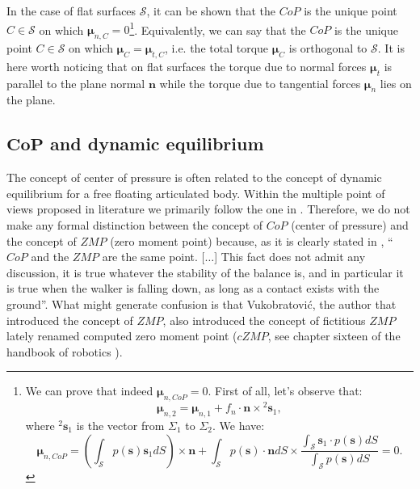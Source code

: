 \documentclass[12pt,a4paper,twoside]{article}
\begin{document}
In the case of flat surfaces $\mathcal S$, it can be shown \cite{sardain2004} that the $CoP$ is the unique point $C \in \mathcal S$ on which $\boldsymbol\mu_{n,C} = 0$\footnote{We can prove that indeed $\boldsymbol\mu_{n,CoP} = 0$. First of all, let's observe that:
$$ 
\boldsymbol\mu_{n,2} = \boldsymbol\mu_{n,1} + f_n \cdot \mathbf n \times \mathbf {}^2 \mathbf s_{1},
$$
where ${}^2 \mathbf s_{1}$ is the vector from $\Sigma_1$ to $\Sigma_2$. We have:
$$
\boldsymbol\mu_{n,CoP} = \left( \int_{\mathcal S} p(\mathbf s) \mathbf s_1 dS \right) \times \mathbf n  + \int_{\mathcal S} p(\mathbf s) \cdot \mathbf n dS \times \frac{\int_{\mathcal S} \mathbf s_1 \cdot p(\mathbf s) dS}{\int_{\mathcal S} p(\mathbf s) dS} = 0.
$$}. Equivalently, we can say that the $CoP$ is the unique point $C \in \mathcal S$ on which  $\boldsymbol\mu_{C} = \boldsymbol\mu_{t,C}$, i.e. the total torque $\boldsymbol\mu_{C}$ is orthogonal to $\mathcal S$. It is here worth noticing that on flat surfaces the torque due to normal forces $\boldsymbol\mu_{t}$ is parallel to the plane normal $\mathbf n$ while the torque due to tangential forces $\boldsymbol\mu_{n}$ lies on the plane. 

\subsection{$\bm {CoP}$ and dynamic equilibrium}

The concept of center of pressure is often related to the concept of dynamic equilibrium for a free floating articulated body. Within the multiple point of views proposed in literature we primarily follow the one in \cite{sardain2004}. Therefore, we do not make any formal distinction between the concept of $CoP$ (center of pressure) and the concept of $ZMP$ (zero moment point) because, as it is clearly stated in \cite{sardain2004}, ``$CoP$ and the $ZMP$ are the same point. [$\dots$] This fact does not admit any discussion, it is true whatever the stability of the balance is, and in particular it is true when the walker is falling down, as long as a contact exists with the ground''. What might generate confusion is that Vukobratovi\'c, the author that introduced the concept of $ZMP$, also introduced the concept of fictitious $ZMP$ lately renamed computed zero moment point ($cZMP$, see chapter sixteen of the handbook of robotics \cite{handbook2008}). 
\end{document}
